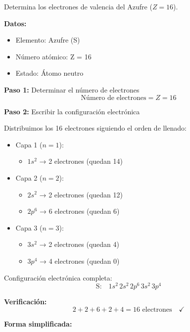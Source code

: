 \begin{exercise}
    Determina los electrones de valencia del Azufre (\( Z = 16 \)).
    \begin{solu}
        \textbf{Datos:}
        \begin{itemize}
            \item Elemento: Azufre (S)
            \item Número atómico: Z = 16
            \item Estado: Átomo neutro
        \end{itemize}

        \textbf{Paso 1:} Determinar el número de electrones
        \[
            \text{Número de electrones} = Z = 16
        \]

        \textbf{Paso 2:} Escribir la configuración electrónica

        Distribuimos los 16 electrones siguiendo el orden de llenado:
        \begin{itemize}
            \item Capa 1 (\(n = 1\)):
            \begin{itemize}
                \item \(1s^2\) → 2 electrones (quedan 14)
            \end{itemize}
            \item Capa 2 (\(n = 2\)):
            \begin{itemize}
                \item \(2s^2\) → 2 electrones (quedan 12)
                \item \(2p^6\) → 6 electrones (quedan 6)
            \end{itemize}
            \item Capa 3 (\(n = 3\)):
            \begin{itemize}
                \item \(3s^2\) → 2 electrones (quedan 4)
                \item \(3p^4\) → 4 electrones (quedan 0)
            \end{itemize}
        \end{itemize}

        Configuración electrónica completa:
        \[
            \text{S:} \quad 1s^2 \, 2s^2 \, 2p^6 \, 3s^2 \, 3p^4
        \]

        \textbf{Verificación:}
        \[
            2 + 2 + 6 + 2 + 4 = 16 \text{ electrones} \quad \checkmark
        \]

        \textbf{Forma simplificada:}


\end{solu}
\end{exercise}
